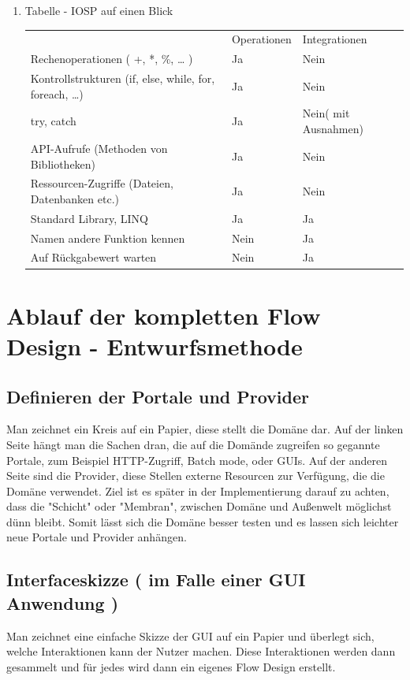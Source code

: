 \documentclass[11pt]{article}
\begin{document}
\begin{enumerate}
\item Tabelle -  IOSP auf einen Blick
\label{sec:orgheadline42}


\begin{center}
\begin{tabular}{lll}
 & Operationen & Integrationen\\
Rechenoperationen ( +, *, \%, \ldots{} ) & Ja & Nein\\
Kontrollstrukturen (if, else, while, for, foreach, \ldots{}) & Ja & Nein\\
try, catch & Ja & Nein( mit Ausnahmen)\\
API-Aufrufe (Methoden von Bibliotheken) & Ja & Nein\\
Ressourcen-Zugriffe (Dateien, Datenbanken etc.) & Ja & Nein\\
Standard Library, LINQ & Ja & Ja\\
Namen andere Funktion kennen & Nein & Ja\\
Auf Rückgabewert warten & Nein & Ja\\
\end{tabular}
\end{center}
\end{enumerate}

\section{Ablauf der kompletten Flow Design - Entwurfsmethode}
\label{sec:orgheadline49}

\subsection{Definieren der Portale und Provider}
\label{sec:orgheadline45}
    Man zeichnet ein Kreis auf ein Papier, diese stellt die Domäne dar.
    Auf der linken Seite hängt man die Sachen dran, die auf die Domände zugreifen so gegannte Portale, zum Beispiel HTTP-Zugriff,
    Batch mode, oder GUIs.
    Auf der anderen Seite sind die Provider, diese Stellen externe Resourcen zur Verfügung, die die Domäne verwendet.
    Ziel ist es später in der Implementierung darauf zu achten, dass die "Schicht" oder "Membran", zwischen Domäne und Außenwelt möglichst
dünn bleibt. Somit lässt sich die Domäne besser testen und es lassen sich leichter neue Portale und Provider anhängen.

\subsection{Interfaceskizze ( im Falle einer GUI Anwendung )}
\label{sec:orgheadline46}
Man zeichnet eine einfache Skizze der GUI auf ein Papier und überlegt sich, welche Interaktionen kann der Nutzer machen.
Diese Interaktionen werden dann gesammelt und für jedes wird dann ein eigenes Flow Design erstellt.
\end{document}

